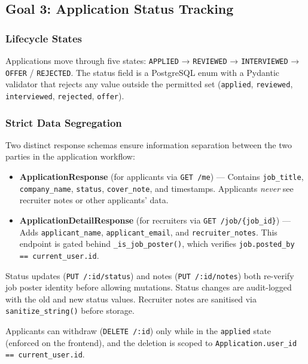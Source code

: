 \subsection{Goal 3: Application Status Tracking}

\subsubsection{Lifecycle States}

Applications move through five states: \texttt{APPLIED} → \texttt{REVIEWED} → \texttt{INTERVIEWED} → \texttt{OFFER} / \texttt{REJECTED}. The status field is a PostgreSQL enum with a Pydantic validator that rejects any value outside the permitted set (\texttt{applied}, \texttt{reviewed}, \texttt{interviewed}, \texttt{rejected}, \texttt{offer}).

\subsubsection{Strict Data Segregation}

Two distinct response schemas ensure information separation between the two parties in the application workflow:

\begin{itemize}
    \item \textbf{ApplicationResponse} (for applicants via \texttt{GET /me}) — Contains \texttt{job\_title}, \texttt{company\_name}, \texttt{status}, \texttt{cover\_note}, and timestamps. Applicants \emph{never} see recruiter notes or other applicants' data.
    \item \textbf{ApplicationDetailResponse} (for recruiters via \texttt{GET /job/\{job\_id\}}) — Adds \texttt{applicant\_name}, \texttt{applicant\_email}, and \texttt{recruiter\_notes}. This endpoint is gated behind \texttt{\_is\_job\_poster()}, which verifies \texttt{job.posted\_by == current\_user.id}.
\end{itemize}

Status updates (\texttt{PUT /:id/status}) and notes (\texttt{PUT /:id/notes}) both re-verify job poster identity before allowing mutations. Status changes are audit-logged with the old and new status values. Recruiter notes are sanitised via \texttt{sanitize\_string()} before storage.

Applicants can withdraw (\texttt{DELETE /:id}) only while in the \texttt{applied} state (enforced on the frontend), and the deletion is scoped to \texttt{Application.user\_id == current\_user.id}.

